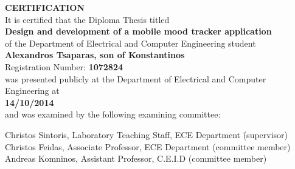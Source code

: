 \thispagestyle{empty}

\begin{center}
    \textbf{\LARGE CERTIFICATION}\\[2em]
    
    It is certified that the Diploma Thesis titled \\[1em]
    
    \textbf{\Large Design and development of a mobile mood tracker application} \\[2em]
    
    of the Department of Electrical and Computer Engineering student \\[2em]
    
    \textbf{\large Alexandros Tsaparas, son of Konstantinos} \\[1em]
    
    Registration Number: \textbf{1072824} \\[2em]
    
    was presented publicly at the Department of Electrical and Computer Engineering at \\[2em]
    
    \textbf{14/10/2014} \\[2em]
    
    and was examined by the following examining committee: \\[3em]
    
    \begin{tabbing}
        Christos Sintoris, Laboratory Teaching Staff, ECE Department \hspace{1cm} \= (supervisor) \\
        Christos Feidas, Associate Professor, ECE Department \> (committee member) \\
        Andreas Komninos, Assistant Professor, C.E.I.D \> (committee member)
    \end{tabbing}
    
    \vfill
    

\end{center}
